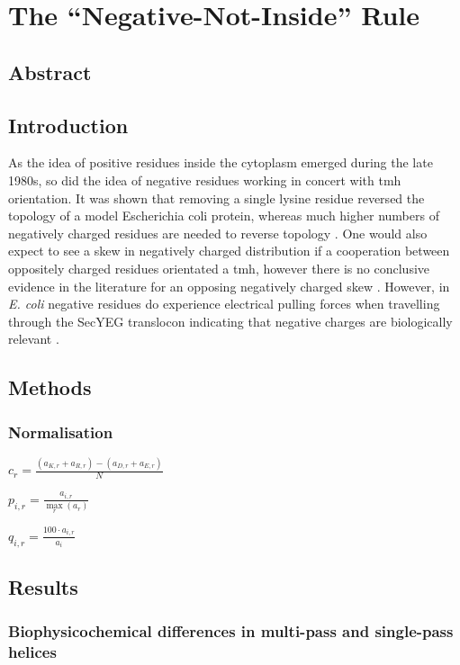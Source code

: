 
\chapter{The ``Negative-Not-Inside'' Rule}
\section{Abstract}

\section{Introduction}
As the idea of positive residues inside the cytoplasm emerged during the late 1980s, so did the idea of negative residues working in concert with \gls{tmh} orientation. It was shown that removing a single lysine residue reversed the topology of a model Escherichia coli protein, whereas much higher numbers of negatively charged residues are needed to reverse topology \cite{Nilsson1990}. One would also expect to see a skew in negatively charged distribution if a cooperation between oppositely charged residues orientated a \gls{tmh}, however there is no conclusive evidence in the literature for an opposing negatively charged skew \cite{Granseth2005, Nilsson2005, Sharpe2010, Baeza-Delgado2013, Pogozheva2013}. However, in {\it E. coli} negative residues do experience electrical pulling forces when travelling through the SecYEG translocon indicating that negative charges are biologically relevant \cite{Ismail2015}.

\section{Methods}

\subsection{Normalisation}

$c_r=\frac{(a_{K,r}+a_{R,r})-(a_{D,r}+a_{E,r})}{N}$

$p_{i,r}=\frac{a_{i,r}}{\underset{r}{\max}{(a_r)}}$

$q_{i,r}=\frac{100·a_{i,r}}{a_i}$

\section{Results}
\subsection{Biophysicochemical differences in multi-pass and single-pass helices}
